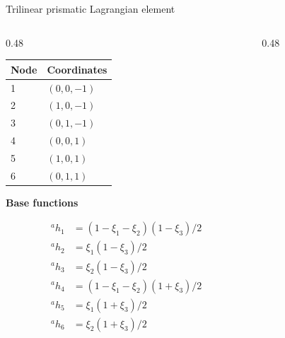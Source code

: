 \documentclass[aspectratio=169]{beamer}
\begin{document}
\begin{frame}{Trilinear prismatic Lagrangian element}
    \vspace{-0.2cm}
    \begin{columns}
        \begin{column}{0.48\textwidth}
            \small
            \begin{center}
                \begin{tabular}{l|l}
                    Node & Coordinates \\ \hline
                    1    & $(0,0,-1)$  \\
                    2    & $(1,0,-1)$  \\
                    3    & $(0,1,-1)$  \\
                    4    & $(0,0,1)$   \\
                    5    & $(1,0,1)$   \\
                    6    & $(0,1,1)$   \\
                \end{tabular}
                \vspace{0.3cm}
                \newline\textbf{Base functions}
            \end{center}
            \vspace{-0.5cm}
            \begin{align*}
                {}^ah_1 & = (1-\xi_1-\xi_2)(1-\xi_3)/2 \\
                {}^ah_2 & = \xi_1(1-\xi_3)/2           \\
                {}^ah_3 & = \xi_2 (1-\xi_3)/2          \\
                {}^ah_4 & = (1-\xi_1-\xi_2)(1+\xi_3)/2 \\
                {}^ah_5 & = \xi_1(1+\xi_3)/2           \\
                {}^ah_6 & = \xi_2 (1+\xi_3)/2          \\
            \end{align*}
        \end{column}
        \begin{column}{0.48\textwidth}
\end{column}
\end{columns}
\end{frame}
\end{document}
